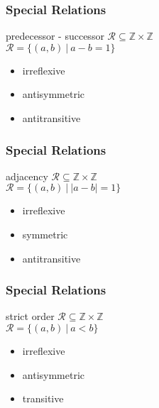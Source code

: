 \documentclass[dvipsnames]{beamer}
\begin{document}

\begin{frame}
  \frametitle{Special Relations}

  \begin{block}{predecessor - successor}
    $\mathcal{R} \subseteq \mathbb{Z} \times \mathbb{Z}$\\
    $\mathcal{R} = \{(a,b)~|~a-b=1\}$

    \medskip
    \begin{itemize}
      \item irreflexive
      \item antisymmetric
      \item antitransitive
    \end{itemize}
  \end{block}
\end{frame}

\begin{frame}
  \frametitle{Special Relations}

  \begin{block}{adjacency}
    $\mathcal{R} \subseteq \mathbb{Z} \times \mathbb{Z}$\\
    $\mathcal{R} = \{(a,b)~|~|a-b|=1\}$

    \medskip
    \begin{itemize}
      \item irreflexive
      \item symmetric
      \item antitransitive
    \end{itemize}
  \end{block}
\end{frame}

\begin{frame}
  \frametitle{Special Relations}

  \begin{block}{strict order}
    $\mathcal{R} \subseteq \mathbb{Z} \times \mathbb{Z}$\\
    $\mathcal{R} = \{(a,b)~|~a<b\}$

    \medskip
    \begin{itemize}
      \item irreflexive
      \item antisymmetric
      \item transitive
    \end{itemize}
  \end{block}
\end{frame}
\end{document}

